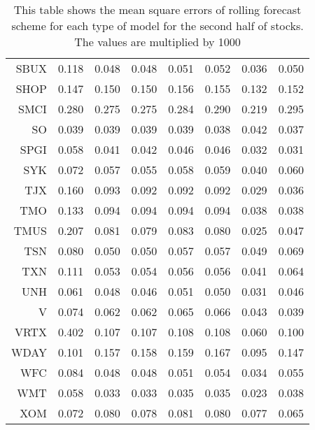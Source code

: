 \begin{table}[ht]
\begin{tabular}{rrrrrrrr}
  SBUX & 0.118 & 0.048 & 0.048 & 0.051 & 0.052 & 0.036 & 0.050 \\ 
  SHOP & 0.147 & 0.150 & 0.150 & 0.156 & 0.155 & 0.132 & 0.152 \\ 
  SMCI & 0.280 & 0.275 & 0.275 & 0.284 & 0.290 & 0.219 & 0.295 \\ 
  SO & 0.039 & 0.039 & 0.039 & 0.039 & 0.038 & 0.042 & 0.037 \\ 
  SPGI & 0.058 & 0.041 & 0.042 & 0.046 & 0.046 & 0.032 & 0.031 \\ 
  SYK & 0.072 & 0.057 & 0.055 & 0.058 & 0.059 & 0.040 & 0.060 \\ 
  TJX & 0.160 & 0.093 & 0.092 & 0.092 & 0.092 & 0.029 & 0.036 \\ 
  TMO & 0.133 & 0.094 & 0.094 & 0.094 & 0.094 & 0.038 & 0.038 \\ 
  TMUS & 0.207 & 0.081 & 0.079 & 0.083 & 0.080 & 0.025 & 0.047 \\ 
  TSN & 0.080 & 0.050 & 0.050 & 0.057 & 0.057 & 0.049 & 0.069 \\ 
  TXN & 0.111 & 0.053 & 0.054 & 0.056 & 0.056 & 0.041 & 0.064 \\ 
  UNH & 0.061 & 0.048 & 0.046 & 0.051 & 0.050 & 0.031 & 0.046 \\ 
  V & 0.074 & 0.062 & 0.062 & 0.065 & 0.066 & 0.043 & 0.039 \\ 
  VRTX & 0.402 & 0.107 & 0.107 & 0.108 & 0.108 & 0.060 & 0.100 \\ 
  WDAY & 0.101 & 0.157 & 0.158 & 0.159 & 0.167 & 0.095 & 0.147 \\ 
  WFC & 0.084 & 0.048 & 0.048 & 0.051 & 0.054 & 0.034 & 0.055 \\ 
  WMT & 0.058 & 0.033 & 0.033 & 0.035 & 0.035 & 0.023 & 0.038 \\ 
  XOM & 0.072 & 0.080 & 0.078 & 0.081 & 0.080 & 0.077 & 0.065 \\ 
   \hline
\end{tabular}
\caption[MSE rolling forecast (2)]{This table shows the mean square errors of rolling forecast scheme for each type of model for the second half of stocks. 
                     The values are multiplied by 1000} 
\label{Table:MSE_r_2}
\end{table}
